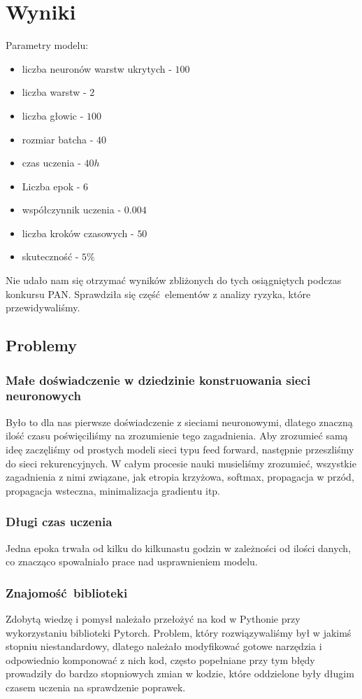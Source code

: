 \newpage
\section{Wyniki}

Parametry modelu:
\begin{itemize}
	  \item liczba neuronów warstw ukrytych - $100$
	  \item liczba warstw - $2$
	  \item liczba głowic - $100$
	  \item rozmiar batcha - $40$
	  \item czas uczenia - $40h$
	  \item Liczba epok - $6$
	  \item współczynnik uczenia - $0.004$
	  \item liczba kroków czasowych - $50$
	  \item skuteczność - $5\%$
	\end{itemize}
	
Nie udało nam się otrzymać wyników zbliżonych do tych osiągniętych podczas konkursu PAN. Sprawdziła się
część elementów z analizy ryzyka, które przewidywaliśmy.

\subsection{Problemy}
\subsubsection{Małe doświadczenie w dziedzinie konstruowania sieci neuronowych}
Było to dla nas pierwsze doświadczenie z sieciami neuronowymi, dlatego znaczną ilość czasu poświęciliśmy na 
zrozumienie tego zagadnienia. Aby zrozumieć samą ideę zaczęliśmy od prostych modeli sieci typu feed forward,
następnie przeszliśmy do sieci rekurencyjnych. W całym procesie nauki musieliśmy zrozumieć,
wszystkie zagadnienia z nimi związane, jak etropia krzyżowa, softmax, propagacja w przód, propagacja wsteczna, 
minimalizacja gradientu itp.
 
\subsubsection{Długi czas uczenia}
Jedna epoka trwała od kilku do kilkunastu godzin w zależności od ilości danych, co znacząco spowalniało 
prace nad usprawnieniem modelu. 
 
\subsubsection{Znajomość biblioteki}
Zdobytą wiedzę i pomysł należało przełożyć na kod w Pythonie przy wykorzystaniu biblioteki Pytorch. 
Problem, który rozwiązywaliśmy był w jakimś stopniu niestandardowy, dlatego należało modyfikować 
gotowe narzędzia i odpowiednio komponować z nich kod, często popełniane przy tym błędy prowadziły 
do bardzo stopniowych zmian w kodzie, które oddzielone były długim czasem uczenia na sprawdzenie poprawek.

